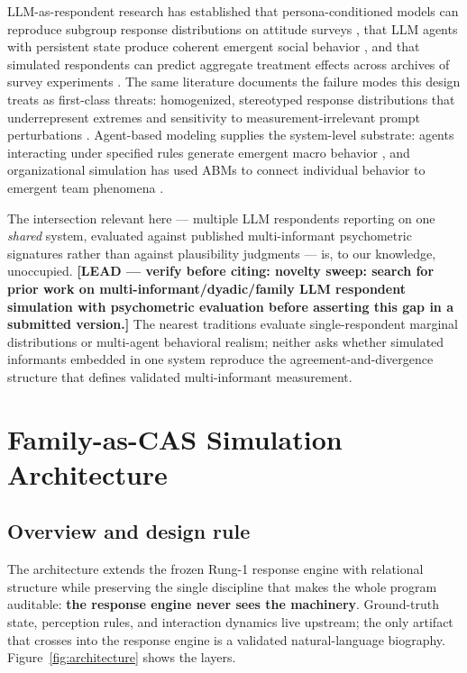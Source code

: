 \documentclass[12pt, letterpaper]{article}
\newcommand{\lead}[1]{\textcolor{red!65!black}{\textbf{[LEAD --- verify before citing: #1]}}}
\begin{document}
LLM-as-respondent research has established that persona-conditioned models can reproduce subgroup response distributions on attitude surveys \parencite{argyle2023}, that LLM agents with persistent state produce coherent emergent social behavior \parencite{park2023}, and that simulated respondents can predict aggregate treatment effects across archives of survey experiments \parencite{hewitt2024}. The same literature documents the failure modes this design treats as first-class threats: homogenized, stereotyped response distributions that underrepresent extremes \parencite{bisbee2024} and sensitivity to measurement-irrelevant prompt perturbations \parencite{tjuatja2024}. Agent-based modeling supplies the system-level substrate: agents interacting under specified rules generate emergent macro behavior \parencite{bonabeau2002}, and organizational simulation has used ABMs to connect individual behavior to emergent team phenomena \parencite{kozlowski2013}.

The intersection relevant here --- multiple LLM respondents reporting on one \emph{shared} system, evaluated against published multi-informant psychometric signatures rather than against plausibility judgments --- is, to our knowledge, unoccupied. \lead{novelty sweep: search for prior work on multi-informant/dyadic/family LLM respondent simulation with psychometric evaluation before asserting this gap in a submitted version.} The nearest traditions evaluate single-respondent marginal distributions or multi-agent behavioral realism; neither asks whether simulated informants embedded in one system reproduce the agreement-and-divergence structure that defines validated multi-informant measurement.

\section{Family-as-CAS Simulation Architecture}
\label{sec:architecture}

\subsection{Overview and design rule}

The architecture extends the frozen Rung-1 response engine with relational structure while preserving the single discipline that makes the whole program auditable: \textbf{the response engine never sees the machinery}. Ground-truth state, perception rules, and interaction dynamics live upstream; the only artifact that crosses into the response engine is a validated natural-language biography. Figure~\ref{fig:architecture} shows the layers.
\end{document}
